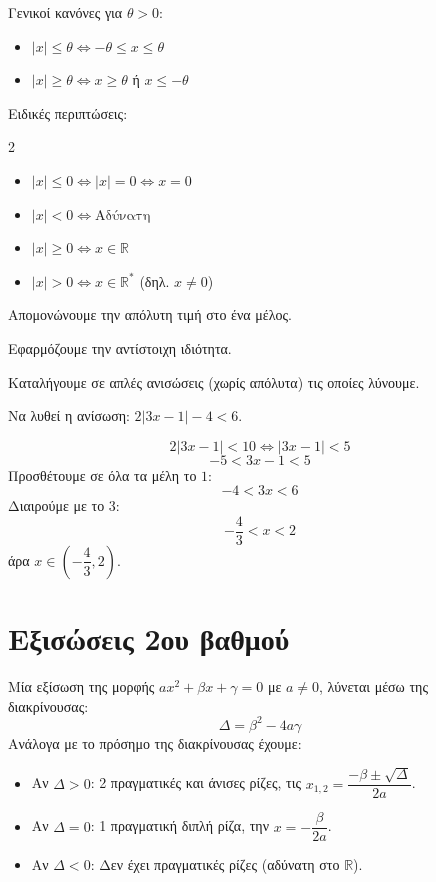Γενικοί κανόνες για $\theta > 0$:
\begin{itemize}
    \item $|x| \leq \theta \Leftrightarrow -\theta \leq x \leq \theta$ \quad 
    \item $|x| \geq \theta \Leftrightarrow x \geq \theta$ ή $x \leq -\theta$ \quad 
\end{itemize}
Ειδικές περιπτώσεις:
\begin{multicols}{2}
\begin{itemize}
    \item $|x| \leq 0 \Leftrightarrow |x| = 0 \Leftrightarrow x = 0$
    \item $|x| < 0 \Leftrightarrow \text{Αδύνατη}$
    \item $|x| \geq 0 \Leftrightarrow x \in \mathbb{R}$
    \item $|x| > 0 \Leftrightarrow x \in \mathbb{R}^*$ (δηλ. $x \neq 0$)
\end{itemize}
\end{multicols}
\bhmata
\begin{bhma}
    \item Απομονώνουμε την απόλυτη τιμή στο ένα μέλος.
    \item Εφαρμόζουμε την αντίστοιχη ιδιότητα.
    \item Καταλήγουμε σε απλές ανισώσεις (χωρίς απόλυτα) τις οποίες λύνουμε.
\end{bhma}


Να λυθεί η ανίσωση: $2|3x - 1| - 4 < 6$.

\lysh
\[ 2|3x - 1| < 10 \Leftrightarrow |3x - 1| < 5 \]
\[ -5 < 3x - 1 < 5 \]
Προσθέτουμε σε όλα τα μέλη το $1$:
\[ -4 < 3x < 6 \]
Διαιρούμε με το $3$:
\[ -\dfrac{4}{3} < x < 2 \]
άρα $x \in \left(-\dfrac{4}{3}, 2\right)$.

\section{Εξισώσεις 2ου βαθμού}

Μία εξίσωση της μορφής $a x^2 + \beta x + \gamma = 0$ με $a \neq 0$, λύνεται μέσω της διακρίνουσας:
\[ \Delta = \beta^2 - 4a\gamma \]
Ανάλογα με το πρόσημο της διακρίνουσας έχουμε:
\begin{itemize}
    \item Αν $\Delta > 0$: 2 πραγματικές και άνισες ρίζες, τις $x_{1,2} = \dfrac{-\beta \pm \sqrt{\Delta}}{2a}$.
    \item Αν $\Delta = 0$: 1 πραγματική διπλή ρίζα, την $x = -\dfrac{\beta}{2a}$.
    \item Αν $\Delta < 0$: Δεν έχει πραγματικές ρίζες (αδύνατη στο $\mathbb{R}$).
\end{itemize}

